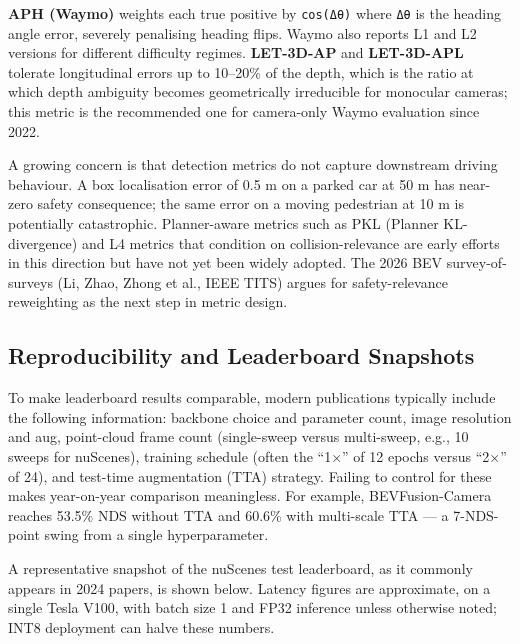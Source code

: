 \documentclass{article}
\begin{document}
\textbf{APH (Waymo)} weights each true positive by \texttt{\textbar{}cos(Δθ)\textbar{}} where \texttt{Δθ} is the heading angle error, severely penalising heading flips. Waymo also reports L1 and L2 versions for different difficulty regimes. \textbf{LET-3D-AP} and \textbf{LET-3D-APL} \citep{hung2022let3daplongitudina} tolerate longitudinal errors up to 10--20\% of the depth, which is the ratio at which depth ambiguity becomes geometrically irreducible for monocular cameras; this metric is the recommended one for camera-only Waymo evaluation since 2022.

A growing concern is that detection metrics do not capture downstream driving behaviour. A box localisation error of 0.5 m on a parked car at 50 m has near-zero safety consequence; the same error on a moving pedestrian at 10 m is potentially catastrophic. Planner-aware metrics such as PKL (Planner KL-divergence) and L4 metrics that condition on collision-relevance are early efforts in this direction but have not yet been widely adopted. The 2026 BEV survey-of-surveys (Li, Zhao, Zhong et al., IEEE TITS) argues for safety-relevance reweighting as the next step in metric design.

\subsection{Reproducibility and Leaderboard Snapshots}\label{reproducibility-and-leaderboard-snapshots}

To make leaderboard results comparable, modern publications typically include the following information: backbone choice and parameter count, image resolution and aug, point-cloud frame count (single-sweep versus multi-sweep, e.g., 10 sweeps for nuScenes), training schedule (often the ``1×'' of 12 epochs versus ``2×'' of 24), and test-time augmentation (TTA) strategy. Failing to control for these makes year-on-year comparison meaningless. For example, BEVFusion-Camera reaches 53.5\% NDS without TTA and 60.6\% with multi-scale TTA --- a 7-NDS-point swing from a single hyperparameter.

A representative snapshot of the nuScenes test leaderboard, as it commonly appears in 2024 papers, is shown below. Latency figures are approximate, on a single Tesla V100, with batch size 1 and FP32 inference unless otherwise noted; INT8 deployment can halve these numbers.
\end{document}
